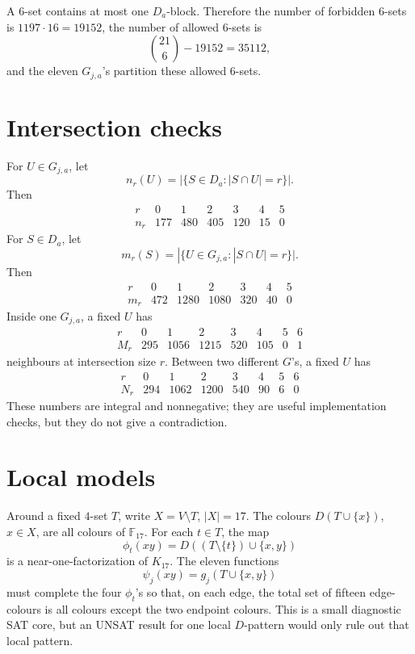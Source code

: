 \documentclass[11pt]{article}
\newcommand{\F}{\mathbb F_{17}}
\begin{document}
A \(6\)-set contains at most one \(D_a\)-block.  Therefore the number of
forbidden \(6\)-sets is \(1197\cdot16=19152\), the number of allowed \(6\)-sets
is
\[
  \binom{21}{6}-19152=35112,
\]
and the eleven \(G_{j,a}\)'s partition these allowed \(6\)-sets.

\section*{Intersection checks}

For \(U\in G_{j,a}\), let
\[
  n_r(U)=|\{S\in D_a:|S\cap U|=r\}|.
\]
Then
\[
\begin{array}{c|rrrrrr}
r&0&1&2&3&4&5\\
\hline
n_r&177&480&405&120&15&0
\end{array}
\]
For \(S\in D_a\), let
\[
  m_r(S)=|\{U\in G_{j,a}:|S\cap U|=r\}|.
\]
Then
\[
\begin{array}{c|rrrrrr}
r&0&1&2&3&4&5\\
\hline
m_r&472&1280&1080&320&40&0
\end{array}
\]
Inside one \(G_{j,a}\), a fixed \(U\) has
\[
\begin{array}{c|rrrrrrr}
r&0&1&2&3&4&5&6\\
\hline
M_r&295&1056&1215&520&105&0&1
\end{array}
\]
neighbours at intersection size \(r\).  Between two different \(G\)'s, a fixed
\(U\) has
\[
\begin{array}{c|rrrrrrr}
r&0&1&2&3&4&5&6\\
\hline
N_r&294&1062&1200&540&90&6&0
\end{array}
\]
These numbers are integral and nonnegative; they are useful implementation
checks, but they do not give a contradiction.

\section*{Local models}

Around a fixed \(4\)-set \(T\), write \(X=V\setminus T\), \(|X|=17\).  The
colours \(D(T\cup\{x\})\), \(x\in X\), are all colours of \(\F\).  For each
\(t\in T\), the map
\[
  \phi_t(xy)=D((T\setminus\{t\})\cup\{x,y\})
\]
is a near-one-factorization of \(K_{17}\).  The eleven functions
\[
  \psi_j(xy)=g_j(T\cup\{x,y\})
\]
must complete the four \(\phi_t\)'s so that, on each edge, the total set of
fifteen edge-colours is all colours except the two endpoint colours.  This is a
small diagnostic SAT core, but an UNSAT result for one local \(D\)-pattern
would only rule out that local pattern.
\end{document}
